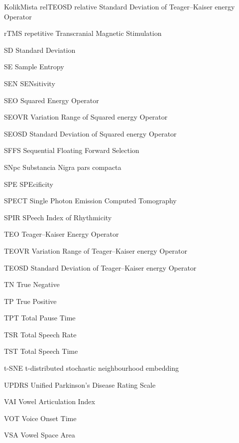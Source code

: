 \begin{seznamzkratek}{KolikMista}
		{relTEOSD}
		{relative Standard Deviation of Teager–Kaiser energy Operator}

		{rTMS}
		{repetitive Transcranial Magnetic Stimulation}

		{SD}
		{Standard Deviation}

		{SE}
		{Sample Entropy}

		{SEN}
		{SENsitivity}

		{SEO}
		{Squared Energy Operator}

		{SEOVR}
		{Variation Range of Squared energy Operator}

		{SEOSD}
		{Standard Deviation of Squared energy Operator}

		{SFFS}
		{Sequential Floating Forward Selection}

		{SNpc}
		{Substancia Nigra pars compacta}

		{SPE}
		{SPEcificity}

		{SPECT}
		{Single Photon Emission Computed Tomography}

		{SPIR}
		{SPeech Index of Rhythmicity}

		{TEO}
		{Teager–Kaiser Energy Operator}

		{TEOVR}
		{Variation Range of Teager–Kaiser energy Operator}

		{TEOSD}
		{Standard Deviation of Teager–Kaiser energy Operator}

		{TN}
		{True Negative}

		{TP}
		{True Positive}

		{TPT}
		{Total Pause Time}

		{TSR}
		{Total Speech Rate}

		{TST}
		{Total Speech Time}

		{t-SNE}
		{t-distributed stochastic neighbourhood embedding}

		{UPDRS}
		{Unified Parkinson's Disease Rating Scale}

		{VAI}
		{Vowel Articulation Index}

		{VOT}
		{Voice Onset Time}

		{VSA}
		{Vowel Space Area}

\end{seznamzkratek}